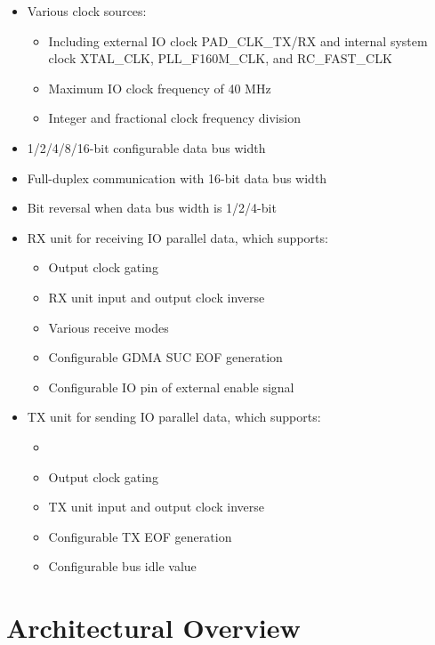 \documentclass[main\_\_EN.tex]{subfiles}
\begin{document}
\begin{itemize}
    \item Various clock sources:
    \begin{itemize}
        \item Including external IO clock PAD\_CLK\_TX/RX and internal system clock XTAL\_CLK, PLL\_F160M\_CLK, and RC\_FAST\_CLK
        \item Maximum IO clock frequency of 40 MHz
        \item Integer and fractional clock frequency division
    \end{itemize}
    \item 1/2/4/8/16-bit configurable data bus width
    \item Full-duplex communication with 16-bit data bus width
    \item Bit reversal when data bus width is 1/2/4-bit
    \item RX unit for receiving IO parallel data, which supports:
    \begin{itemize}
        \item Output clock gating
        \item RX unit input and output clock inverse
        \item Various receive modes
        \item Configurable GDMA SUC EOF generation
        \item Configurable IO pin of external enable signal
    \end{itemize}
    \item TX unit for sending IO parallel data, which supports:
    \begin{itemize}
        \item {}
        \item Output clock gating
        \item TX unit input and output clock inverse
        \item Configurable TX EOF generation
        \item Configurable bus idle value
    \end{itemize}
\end{itemize}



\section{Architectural Overview}
\label{sec:parlio-arch-overview}
\end{document}
